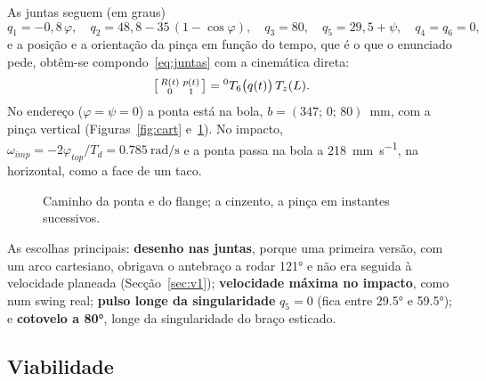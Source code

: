 As juntas seguem (em graus)
\begin{equation}
q_1 = -0{,}8\,\varphi,\quad
q_2 = 48{,}8 - 35\,(1-\cos\varphi),\quad
q_3 = 80,\quad
q_5 = 29{,}5 + \psi,\quad
q_4 = q_6 = 0,
\label{eq:juntas}
\end{equation}
e a posição e a orientação da pinça em função do tempo, que é o que o
enunciado pede, obtêm-se compondo~\eqref{eq:juntas} com a cinemática direta:
\begin{equation}
\left[\begin{smallmatrix} R(t) & p(t)\\ 0 & 1\end{smallmatrix}\right]
= {}^{0}T_{6}\bigl(q(t)\bigr)\,T_z(L).
\label{eq:pose}
\end{equation}
No endereço ($\varphi = \psi = 0$) a ponta está na bola, $b = (347;\,0;\,80)$~mm,
com a pinça vertical (Figuras~\ref{fig:cart} e~\ref{fig:3d}). No impacto,
$\omega_{imp} = -2\varphi_{top}/T_d = \SI{0.785}{\radian\per\second}$ e a
ponta passa na bola a \SI{218}{\milli\meter\per\second}, na horizontal, como
a face de um taco.

\begin{figure}[H]
\centering
\begin{minipage}[b]{0.55\textwidth}
\centering
{}
\caption{Posição, orientação e velocidade da ponta e do flange, com o limite
do fabricante.}
\label{fig:cart}
\end{minipage}\hfill
\begin{minipage}[b]{0.43\textwidth}
\centering
{}
\caption{Caminho da ponta e do flange; a cinzento, a pinça em instantes
sucessivos.}
\label{fig:3d}
\end{minipage}
\end{figure}

As escolhas principais: \textbf{desenho nas juntas}, porque uma primeira
versão, com um arco cartesiano, obrigava o antebraço a rodar \ang{121} e não
era seguida à velocidade planeada (Secção~\ref{sec:v1}); \textbf{velocidade
máxima no impacto}, como num swing real; \textbf{pulso longe da
singularidade} $q_5 = 0$ (fica entre \ang{29.5} e \ang{59.5}); e
\textbf{cotovelo a \ang{80}}, longe da singularidade do braço esticado.

\subsection{Viabilidade}
\label{sec:viab}


